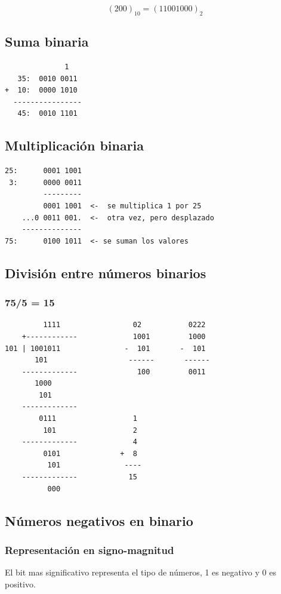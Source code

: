 \documentclass[11pt]{article}
\begin{document}
\[ (200)_{10} = (11001000)_2 \]

\subsection{Suma binaria}
\label{sec:org1ba5de6}
\begin{verbatim}
              1
   35:  0010 0011
+  10:  0000 1010
  ----------------
   45:  0010 1101
\end{verbatim}

\subsection{Multiplicación binaria}
\label{sec:orgbd88272}
\begin{verbatim}
25:      0001 1001   
 3:      0000 0011
         ---------
         0001 1001  <-  se multiplica 1 por 25  
    ...0 0011 001.  <-  otra vez, pero desplazado
    --------------
75:      0100 1011  <- se suman los valores 
\end{verbatim}

\subsection{División entre números binarios}
\label{sec:org2abb805}
\subsubsection*{75/5 = 15}
\label{sec:org997908e}
\begin{verbatim}
         1111                 02           0222
    +------------             1001         1000
101 | 1001011               -  101       -  101  
       101                   ------       ------    
    -------------              100         0011
       1000
        101
    -------------
        0111                  1
         101                  2
    -------------             4
         0101              +  8
          101               ----
    -------------            15 
          000
\end{verbatim}

\subsection{Números negativos en binario}
\label{sec:org7e1e410}
\subsubsection*{Representación en signo-magnitud}
\label{sec:org05fd12e}
El bit mas significativo representa el tipo de números, 1 es negativo y 0 es positivo.
\end{document}
